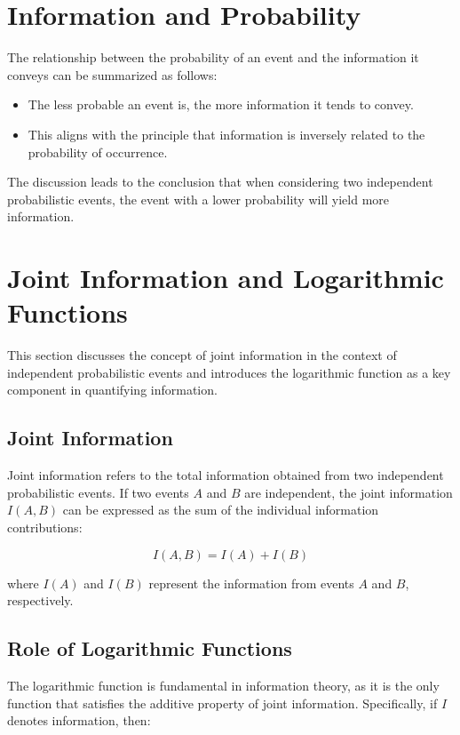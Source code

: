 \documentclass[12pt,a4paper]{article}
\begin{document}
\section{Information and Probability}
The relationship between the probability of an event and the information it conveys can be summarized as follows:

\begin{itemize}
    \item The less probable an event is, the more information it tends to convey.
    \item This aligns with the principle that information is inversely related to the probability of occurrence.
\end{itemize}

The discussion leads to the conclusion that when considering two independent probabilistic events, the event with a lower probability will yield more information.

\section{Joint Information and Logarithmic Functions}
This section discusses the concept of joint information in the context of independent probabilistic events and introduces the logarithmic function as a key component in quantifying information.

\subsection{Joint Information}
Joint information refers to the total information obtained from two independent probabilistic events. If two events \( A \) and \( B \) are independent, the joint information \( I(A, B) \) can be expressed as the sum of the individual information contributions:

\begin{equation}
I(A, B) = I(A) + I(B)
\end{equation}

where \( I(A) \) and \( I(B) \) represent the information from events \( A \) and \( B \), respectively.

\subsection{Role of Logarithmic Functions}
The logarithmic function is fundamental in information theory, as it is the only function that satisfies the additive property of joint information. Specifically, if \( I \) denotes information, then:
\end{document}
